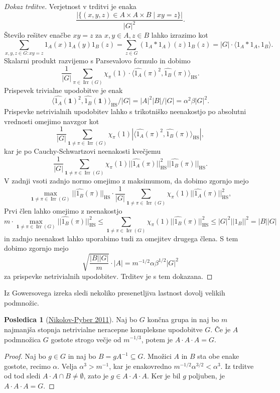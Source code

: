 \documentclass[11pt]{book}
\def\11{\mathbf{1}}
\DeclareMathOperator\Irr{Irr}
\DeclareMathOperator\HS{HS}
\theoremstyle{definition}
\theoremstyle{zgled}
\theoremstyle{odprtproblem}
\theoremstyle{domacanaloga}
\newenvironment{dokaz}
    {\color{siva}\begin{proof}}
    {\end{proof}}
\theoremstyle{izrek}
\newtheorem*{posledica}{Posledica}
\begin{document}
\begin{dokaz}[Dokaz trditve]
Verjetnost v trditvi je enaka 
\[
    \frac{|\{ (x,y,z) \in A \times A \times B \mid xy = z \}|}{|G|^2}.
\]
Število rešitev enačbe $xy = z$ za $x,y \in A, z \in B$ lahko izrazimo kot
\[
    \sum_{x,y,z \in G \colon xy = z} 1_A(x) 1_A(y) 1_B(z)
    = \sum_{z \in G} (1_A * 1_A)(z) 1_B(z)
    = |G| \cdot \langle 1_A * 1_A, 1_B \rangle.
\]
Skalarni produkt razvijemo s Parsevalovo formulo in dobimo
\[
    \frac{1}{|G|} \sum_{\pi \in \Irr(G)} \chi_{\pi}(1) \cdot \langle \widehat{1_A}(\pi)^2, \widehat{1_B}(\pi) \rangle_{\HS}.
\]
Prispevek trivialne upodobitve je enak
\[
    \langle \widehat{1_A}(\11)^2, \widehat{1_B}(\11) \rangle_{\HS}/|G| = |A|^2 |B| / |G| = \alpha^2 \beta |G|^2. 
\]
Prispevke netrivialnih upodobitev lahko s trikotniško neenakostjo po absolutni vrednosti omejimo navzgor kot
\[
    \frac{1}{|G|} \sum_{\11 \neq \pi \in \Irr(G)} \chi_{\pi}(1) \left| \langle \widehat{1_A}(\pi)^2, \widehat{1_B}(\pi) \rangle_{\HS} \right|,
\]
kar je po Cauchy-Schwartzovi neenakosti kvečjemu
\[
    \frac{1}{|G|} \sum_{\11 \neq \pi \in \Irr(G)} \chi_{\pi}(1) || \widehat{1_A}(\pi) ||_{\HS}^2 || \widehat{1_B}(\pi) ||_{\HS}.
\]
V zadnji vsoti zadnjo normo omejimo z maksimumom, da dobimo zgornjo mejo
\[
    \max_{\11 \neq \pi \in \Irr(G)} || \widehat{1_B}(\pi) ||_{\HS} \cdot 
    \frac{1}{|G|} \sum_{\11 \neq \pi \in \Irr(G)} \chi_{\pi}(1) || \widehat{1_A}(\pi) ||_{\HS}^2,
\]
Prvi člen lahko omejimo z neenakostjo
\[
    m \cdot \max_{\11 \neq \pi \in \Irr(G)} || \widehat{1_B}(\pi) ||^2_{\HS}
    \leq \sum_{\11 \neq \pi \in \Irr(G)} \chi_{\pi}(1) ||\widehat{1_B}(\pi)||_{\HS}^2 
    \leq |G|^2 ||1_B||^2 = |B||G|
\]
in zadnjo neenakost lahko uporabimo tudi za omejitev drugega člena. S tem dobimo zgornjo mejo
\[
  \sqrt{\frac{|B||G|}{m}} \cdot |A| = m^{-1/2} \alpha \beta^{1/2} |G|^2
\]
za prispevke netrivialnih upodobitev. Trditev je s tem dokazana.
\end{dokaz}

Iz Gowersovega izreka sledi nekoliko presenetljiva lastnost dovolj velikih podmnožic.

\begin{posledica}[\href{https://eudml.org/doc/277468}{Nikolov-Pyber 2011}]
Naj bo $G$ končna grupa in naj bo $m$ najmanjša stopnja netrivialne neracepne kompleksne upodobitve $G$. Če je $A$ podmnožica $G$ gostote strogo večje od $m^{-1/3}$, potem je $A \cdot A \cdot A = G$.
\end{posledica}
\begin{dokaz}
Naj bo $g \in G$ in naj bo $B = g A^{-1} \subseteq G$. Množici $A$ in $B$ sta obe enake gostote, recimo $\alpha$. Velja $\alpha^3 > m^{-1}$, kar je enakovredno $m^{-1/2} \alpha^{3/2} < \alpha^3$. Iz trditve od tod sledi $A \cdot A \cap B \neq \emptyset$, zato je $g \in A \cdot A \cdot A$. Ker je bil $g$ poljuben, je $A \cdot A \cdot A = G$.
\end{dokaz}
\end{document}
